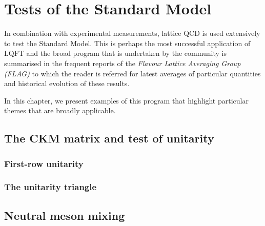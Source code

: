 \chapter{Tests of the Standard Model}
\label{ch:tests-of-sm}

In combination with experimental measurements, lattice QCD is used extensively to test the Standard Model.
This is perhaps the most successful application of LQFT and the broad program that is undertaken by the community is summarised in the frequent reports of the  \textit{Flavour Lattice Averaging Group (FLAG)} to which the reader is referred for latest averages of particular quantities and historical evolution of these results.

In this chapter, we present examples of this  program that highlight particular themes that are broadly  applicable.


\section{The CKM matrix and test of unitarity}

\subsection{First-row unitarity}


\subsection{The unitarity triangle}


\section{Neutral meson mixing}

